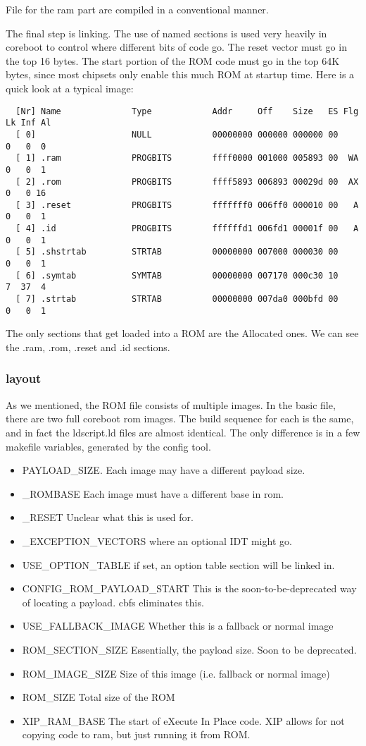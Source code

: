 \documentclass[titlepage,12pt]{article}
\begin{document}
File for the ram part are compiled in a conventional manner. 

The final step is linking. The use of named sections is used very heavily in coreboot to control where different bits of code go. The reset vector must go in the top 16 bytes. The start portion of the ROM code must go in the top 64K bytes, since most chipsets only enable this much ROM at startup time. Here is a quick look at a typical image: 
\begin{verbatim}
  [Nr] Name              Type            Addr     Off    Size   ES Flg Lk Inf Al
  [ 0]                   NULL            00000000 000000 000000 00      0   0  0
  [ 1] .ram              PROGBITS        ffff0000 001000 005893 00  WA  0   0  1
  [ 2] .rom              PROGBITS        ffff5893 006893 00029d 00  AX  0   0 16
  [ 3] .reset            PROGBITS        fffffff0 006ff0 000010 00   A  0   0  1
  [ 4] .id               PROGBITS        ffffffd1 006fd1 00001f 00   A  0   0  1
  [ 5] .shstrtab         STRTAB          00000000 007000 000030 00      0   0  1
  [ 6] .symtab           SYMTAB          00000000 007170 000c30 10      7  37  4
  [ 7] .strtab           STRTAB          00000000 007da0 000bfd 00      0   0  1
\end{verbatim}

The only sections that get loaded into a ROM are the Allocated ones. We can see the .ram, .rom, .reset and .id sections. 
\subsubsection{layout}
As we mentioned, the ROM file consists of multiple images. In the basic file, there are two full coreboot rom images. The build sequence for each is the same, and in fact the ldscript.ld files are almost identical. The only difference is in a few makefile variables, generated by the config tool. 

\begin{itemize}
\item PAYLOAD\_SIZE. Each image may have a different payload size. 
\item \CONFIG_ROMBASE Each image must have a different base in rom. 
\item \CONFIG_RESET Unclear what this is used for. 
\item \_EXCEPTION\_VECTORS where an optional IDT might go.
\item USE\_OPTION\_TABLE if set, an option table section will be linked in. 
\item CONFIG\_ROM\_PAYLOAD\_START This is the soon-to-be-deprecated way of locating a payload. cbfs eliminates this. 
\item USE\_FALLBACK\_IMAGE Whether this is a fallback or normal image
\item ROM\_SECTION\_SIZE Essentially, the payload size. Soon to be deprecated. 
\item ROM\_IMAGE\_SIZE Size of this image (i.e. fallback or normal image)
\item ROM\_SIZE Total size of the ROM
\item XIP\_RAM\_BASE The start of eXecute In Place code. XIP allows for not copying code to ram, but just running it from ROM. 
\end{itemize}
\end{document}
